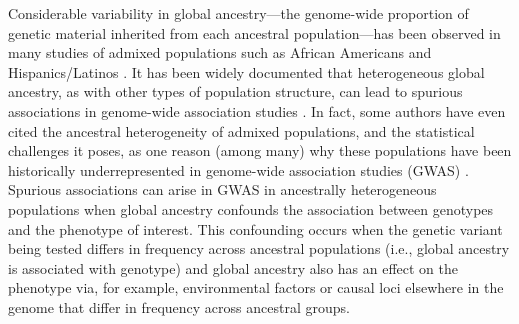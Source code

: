 \documentclass[12pt]{article}
\begin{document}


Considerable variability in global ancestry---the genome-wide proportion of genetic material inherited from each ancestral population---has been observed in many studies of admixed populations such as African Americans and Hispanics/Latinos \citep{parra1998, tishkoff2009, bryc2010aa, bryc2010hl, conomos2016}.
It has been widely documented that heterogeneous global ancestry, as with other types of population structure, can lead to spurious associations in genome-wide association studies \citep{GenomicControl, eigenstrat, marchini2004, price2010}. 
In fact, some authors have even cited the ancestral heterogeneity of admixed populations, and the statistical challenges it poses, as one reason (among many) why these populations have been historically underrepresented in genome-wide association studies (GWAS) \citep{need2009, bustamante2011, popejoy2016, hindorff2018, manolio2019}.
Spurious associations can arise in GWAS in ancestrally heterogeneous populations when global ancestry confounds the association between genotypes and the phenotype of interest. %
This confounding occurs when the genetic variant being tested differs in frequency across ancestral populations (i.e., global ancestry is associated with genotype) and global ancestry also has an effect on the phenotype via, for example, environmental factors or causal loci elsewhere in the genome that differ in frequency across ancestral groups.

\end{document}
